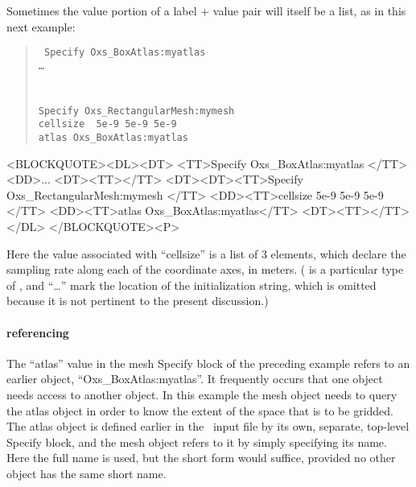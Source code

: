 Sometimes the value portion of a label + value pair will itself be a list,
as in this next example:
\begin{latexonly}
\begin{quote}\tt
Specify Oxs\_BoxAtlas:myatlas \ocb\\
\bi\bi\ldots\\
\ccb\\
\\
Specify Oxs\_RectangularMesh:mymesh \ocb \\
\bi cellsize \ocb\ 5e-9 5e-9 5e-9 \ccb\\
\bi atlas Oxs\_BoxAtlas:myatlas\\
\ccb
\end{quote}
\end{latexonly}
\begin{rawhtml}<BLOCKQUOTE><DL><DT>
<TT>Specify Oxs_BoxAtlas:myatlas {</TT>
<DD>...
<DT><TT>}</TT>
<DT><DT><TT>Specify Oxs_RectangularMesh:mymesh {</TT>
<DD><TT>cellsize { 5e-9 5e-9 5e-9 }</TT>
<DD><TT>atlas Oxs_BoxAtlas:myatlas</TT>
<DT><TT>}</TT></DL>
</BLOCKQUOTE><P>
\end{rawhtml}
Here the value associated with ``cellsize'' is a list of 3 elements,
which declare the sampling rate along each of the coordinate axes, in
meters.  ( is a particular type of ,
and ``\ldots'' mark the location of the 
initialization string, which is omitted because it is not pertinent to
the present discussion.)


\paragraph{ referencing}%
\label{par:oxsExtReferencing}
The ``atlas'' value in the mesh Specify block of the preceding example
refers to an earlier  object, ``Oxs\_BoxAtlas:myatlas''.
It frequently occurs that one  object needs access to
another  object.  In this example the mesh object
 needs to query the atlas object  in order to
know the extent of the space that is to be gridded.  The atlas object is
defined earlier in the \MIF\ input file by its own, separate, top-level
Specify block, and the mesh object refers to it by simply specifying its
name.  Here the full name is used, but the short form 
would suffice, provided no other  object has the same short
name.

